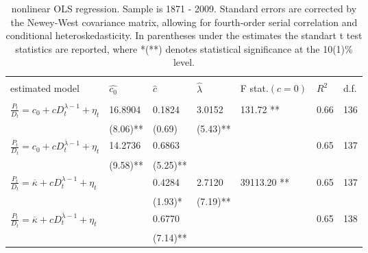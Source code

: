 \documentclass{article}
\begin{document}
\begin{table}[h!]
\centering
\begin{tabular}{l | l l l l l l}
\hline \\
estimated model & $ \widehat{c_0} $ & $ \widehat{c} $ & $\widehat{\lambda}$ &  F stat.$(c = 0)$ & $R^2$ & d.f. \\
\hline \\
$ \frac{P_t}{D_t} =  c_0  + c D_t^{\lambda - 1} + \eta_t $ & 16.8904 & 0.1824 & 3.0152 & 131.72 ** & 0.66 & 136\\
 & (8.06)** & (0.69) & (5.43)** & & &\\
$  \frac{P_t}{D_t} =  c_0  + c D_t^{\overline{\lambda} - 1} + \eta_t $ & 14.2736 & 0.6863 & & & 0.65 & 137  \\
 & (9.58)**  & (5.25)** & & & &\\
$ \frac{P_t}{D_t} =  \overline{\kappa}  + c D_t^{\lambda - 1} + \eta_t $ &  & 0.4284 & 2.7120 & 39113.20 ** & 0.65 & 137\\
 &  & (1.93)* & (7.19)** & & &\\
$  \frac{P_t}{D_t} =  \overline{\kappa}  + c D_t^{\overline{\lambda} - 1} + \eta_t $ &  & 0.6770 & & & 0.65 & 138  \\
 &   & (7.14)** & & & &\\
\hline 
\end{tabular}
\caption{nonlinear OLS regression. Sample is 1871 - 2009. Standard errors are corrected by the Newey-West covariance matrix, allowing for fourth-order serial correlation and conditional heteroskedasticity. In parentheses under the
estimates the standart t test statistics are reported, where *(**) denotes statistical significance at the 10(1)\% level.}
\label{regressionnonlinear}
\end{table}
\end{document}
